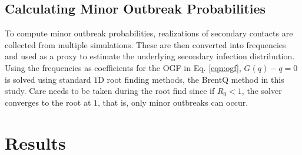 \documentclass[11pt, twocolumn]{article}
\begin{document}
\subsection*{Calculating Minor Outbreak Probabilities}
To compute minor outbreak probabilities, realizations of secondary contacts are collected from multiple simulations. These are then converted into frequencies and used as a proxy to estimate the underlying secondary infection distribution. Using the frequencies as coefficients for the OGF in Eq. \ref{eqn:ogf}, $G(q)-q=0$ is solved using standard $1$D root finding methods, the BrentQ method in this study. Care needs to be taken during the root find since if $R_0<1$, the solver converges to the root at $1$, that is, only minor outbreaks can occur.
\section*{Results}
\end{document}
